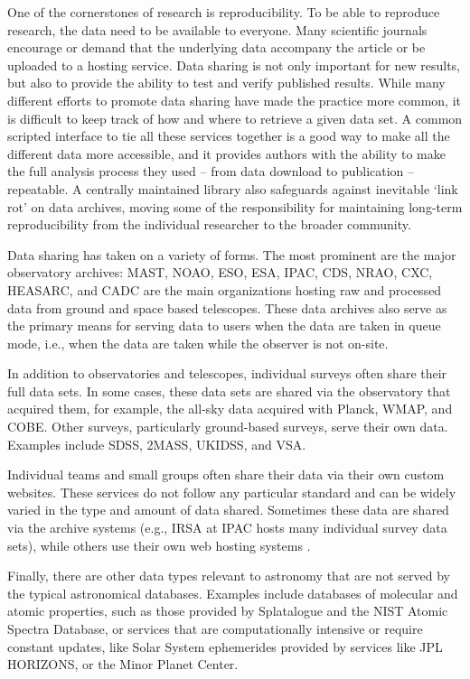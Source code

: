 \documentclass[twocolumn]{aastex62}
\begin{document}
One of the cornerstones of research is reproducibility. To be able to reproduce
research, the data need to be available to everyone. Many scientific journals
encourage or demand that the underlying data  accompany the article or be
uploaded to a hosting service. Data sharing is not only important for new
results, but also to provide the ability to test and verify published results.
While many different efforts to promote data sharing have made the practice
more common, it is difficult to keep track of how and where to retrieve a given
data set. A common scripted interface to tie all these services together is a
good way to make all the different data more accessible, and it provides
authors with the ability to make the full analysis process they used -- from
data download to publication -- repeatable.  A centrally maintained library
also safeguards against inevitable `link rot' on data archives, moving some of
the responsibility for maintaining long-term reproducibility from the
individual researcher to the broader community.

Data sharing has taken on a variety of forms.  The most prominent are the
major observatory archives: MAST, NOAO, ESO, ESA, IPAC, CDS, NRAO, CXC, HEASARC,
and CADC are the main organizations hosting raw and processed data from
ground and space based telescopes.  These data archives also serve as the
primary means for serving data to users when the data are taken in queue
mode, i.e., when the data are taken while the observer is not on-site.

In addition to observatories and telescopes, individual surveys often share
their full data sets.  In some cases, these data sets are shared via the
observatory that acquired them, for example, the all-sky data acquired with
Planck, WMAP, and COBE\@.  Other surveys, particularly ground-based surveys,
serve their own data.  Examples include SDSS, 2MASS, UKIDSS, and VSA.


Individual teams and small groups often share their data via their own
custom websites.  These services do not follow any particular standard and can
be widely varied in the type and amount of data shared.  Sometimes these data
are shared via the archive systems (e.g., IRSA at IPAC hosts many individual
survey data sets), while others use their own web hosting systems \citep[e.g.,
MAGPIS;][]{Helfand2006}.

Finally, there are other data types relevant to astronomy that are not
served by the typical astronomical databases.  Examples include databases of
molecular and atomic properties, such as those provided by Splatalogue and
the NIST Atomic Spectra Database, or services that are computationally
intensive or require constant updates, like Solar System ephemerides
provided by services like JPL HORIZONS, or the Minor Planet Center.
\end{document}

